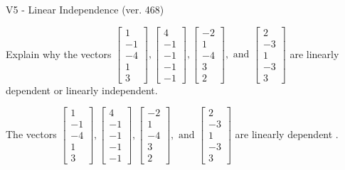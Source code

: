 \begin{exercise}
  \begin{exerciseTitle}V5 - Linear Independence (ver. 468)\end{exerciseTitle}
  \begin{exerciseStatement}
    Explain why the vectors \(\left[\begin{array}{r}
1 \\
-1 \\
-4 \\
1 \\
3
\end{array}\right] , \left[\begin{array}{r}
4 \\
-1 \\
-1 \\
-1 \\
-1
\end{array}\right] , \left[\begin{array}{r}
-2 \\
1 \\
-4 \\
3 \\
2
\end{array}\right] , \text{ and } \left[\begin{array}{r}
2 \\
-3 \\
1 \\
-3 \\
3
\end{array}\right]\) are linearly dependent or linearly independent.	


  \end{exerciseStatement}
  \begin{exerciseAnswer}
   The vectors \(\left[\begin{array}{r}
1 \\
-1 \\
-4 \\
1 \\
3
\end{array}\right] , \left[\begin{array}{r}
4 \\
-1 \\
-1 \\
-1 \\
-1
\end{array}\right] , \left[\begin{array}{r}
-2 \\
1 \\
-4 \\
3 \\
2
\end{array}\right] , \text{ and } \left[\begin{array}{r}
2 \\
-3 \\
1 \\
-3 \\
3
\end{array}\right]\) are 
  	 linearly dependent  .
  


  \end{exerciseAnswer}
\end{exercise}